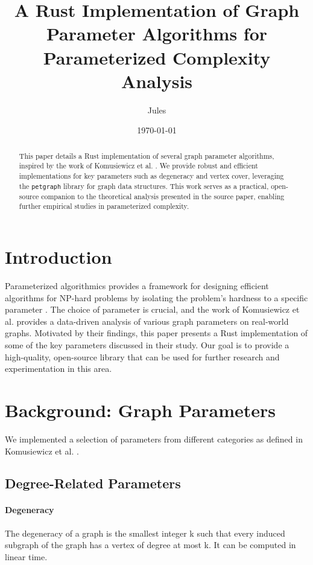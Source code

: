 \documentclass{article}
\title{A Rust Implementation of Graph Parameter Algorithms for Parameterized Complexity Analysis}
\author{Jules}
\date{\today}
\begin{document}
\maketitle

\begin{abstract}
This paper details a Rust implementation of several graph parameter algorithms, inspired by the work of Komusiewicz et al. \cite{komusiewicz2025parameter}. We provide robust and efficient implementations for key parameters such as degeneracy and vertex cover, leveraging the \texttt{petgraph} library for graph data structures. This work serves as a practical, open-source companion to the theoretical analysis presented in the source paper, enabling further empirical studies in parameterized complexity.
\end{abstract}

\section{Introduction}
Parameterized algorithmics provides a framework for designing efficient algorithms for NP-hard problems by isolating the problem's hardness to a specific parameter \cite{downey1999parameterized}. The choice of parameter is crucial, and the work of Komusiewicz et al. \cite{komusiewicz2025parameter} provides a data-driven analysis of various graph parameters on real-world graphs. Motivated by their findings, this paper presents a Rust implementation of some of the key parameters discussed in their study. Our goal is to provide a high-quality, open-source library that can be used for further research and experimentation in this area.

\section{Background: Graph Parameters}
We implemented a selection of parameters from different categories as defined in Komusiewicz et al. \cite{komusiewicz2025parameter}.

\subsection{Degree-Related Parameters}
\paragraph{Degeneracy} The degeneracy of a graph is the smallest integer k such that every induced subgraph of the graph has a vertex of degree at most k. It can be computed in linear time.
\end{document}
